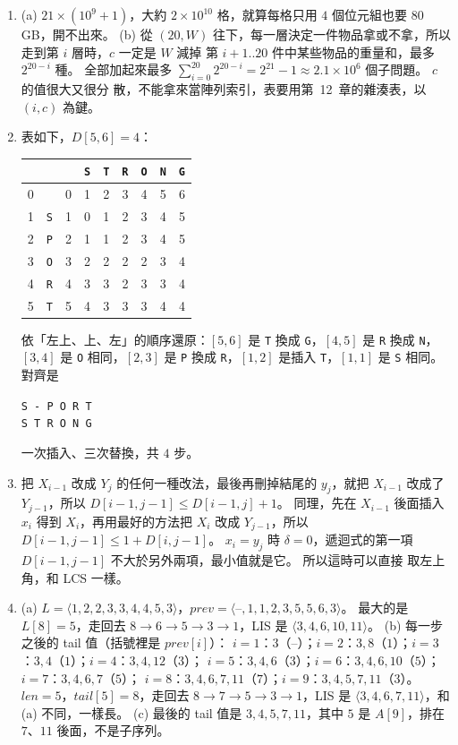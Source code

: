 \begin{enumerate}
\item (a) $21 \times (10^9 + 1)$，大約 $2 \times 10^{10}$ 格，就算每格只用 $4$ 個位元組也要
$80$ GB，開不出來。
(b) 從 $(20, W)$ 往下，每一層決定一件物品拿或不拿，所以走到第 $i$ 層時，$c$ 一定是 $W$ 減掉
第 $i+1..20$ 件中某些物品的重量和，最多 $2^{20 - i}$ 種。 全部加起來最多
$\sum_{i=0}^{20} 2^{20-i} = 2^{21} - 1 \approx 2.1 \times 10^6$ 個子問題。 $c$ 的值很大又很分
散，不能拿來當陣列索引，表要用第~12~章的雜湊表，以 $(i, c)$ 為鍵。

\item 表如下，$D[5, 6] = 4$：
{\footnotesize
\begin{center}
\begin{tabular}{cc*{7}{c}}
& &  & \texttt{S} & \texttt{T} & \texttt{R} & \texttt{O} & \texttt{N} & \texttt{G} \\
\midrule
0 &  & 0 & 1 & 2 & 3 & 4 & 5 & 6 \\
1 & \texttt{S} & 1 & 0 & 1 & 2 & 3 & 4 & 5 \\
2 & \texttt{P} & 2 & 1 & 1 & 2 & 3 & 4 & 5 \\
3 & \texttt{O} & 3 & 2 & 2 & 2 & 2 & 3 & 4 \\
4 & \texttt{R} & 4 & 3 & 3 & 2 & 3 & 3 & 4 \\
5 & \texttt{T} & 5 & 4 & 3 & 3 & 3 & 4 & 4 \\
\end{tabular}
\end{center}
}
依「左上、上、左」的順序還原：$[5,6]$ 是 \texttt{T} 換成 \texttt{G}，$[4,5]$ 是 \texttt{R} 換成
\texttt{N}，$[3,4]$ 是 \texttt{O} 相同，$[2,3]$ 是 \texttt{P} 換成 \texttt{R}，$[1,2]$ 是插入
\texttt{T}，$[1,1]$ 是 \texttt{S} 相同。 對齊是
\begin{center}
\texttt{S - P O R T}\\
\texttt{S T R O N G}
\end{center}
一次插入、三次替換，共 $4$ 步。

\item 把 $X_{i-1}$ 改成 $Y_j$ 的任何一種改法，最後再刪掉結尾的 $y_j$，就把 $X_{i-1}$ 改成了
$Y_{j-1}$，所以 $D[i-1, j-1] \le D[i-1, j] + 1$。 同理，先在 $X_{i-1}$ 後面插入 $x_i$ 得到
$X_i$，再用最好的方法把 $X_i$ 改成 $Y_{j-1}$，所以 $D[i-1, j-1] \le 1 + D[i, j-1]$。 $x_i = y_j$
時 $\delta = 0$，遞迴式的第一項 $D[i-1, j-1]$ 不大於另外兩項，最小值就是它。 所以這時可以直接
取左上角，和 LCS 一樣。

\item (a) $L = \langle 1, 2, 2, 3, 3, 4, 4, 5, 3 \rangle$，$\mathit{prev} = \langle \text{--}, 1,
1, 2, 3, 5, 5, 6, 3 \rangle$。 最大的是 $L[8] = 5$，走回去 $8 \to 6 \to 5 \to 3 \to 1$，LIS 是
$\langle 3, 4, 6, 10, 11 \rangle$。
(b) 每一步之後的 tail 值（括號裡是 $\mathit{prev}[i]$）：
$i = 1$：$3$（--）；$i = 2$：$3, 8$（$1$）；$i = 3$：$3, 4$（$1$）；$i = 4$：$3, 4, 12$（$3$）；
$i = 5$：$3, 4, 6$（$3$）；$i = 6$：$3, 4, 6, 10$（$5$）；$i = 7$：$3, 4, 6, 7$（$5$）；
$i = 8$：$3, 4, 6, 7, 11$（$7$）；$i = 9$：$3, 4, 5, 7, 11$（$3$）。
$\mathit{len} = 5$，$\mathit{tail}[5] = 8$，走回去 $8 \to 7 \to 5 \to 3 \to 1$，LIS 是
$\langle 3, 4, 6, 7, 11 \rangle$，和 (a) 不同，一樣長。
(c) 最後的 tail 值是 $3, 4, 5, 7, 11$，其中 $5$ 是 $A[9]$，排在 $7$、$11$ 後面，不是子序列。


\end{enumerate}
